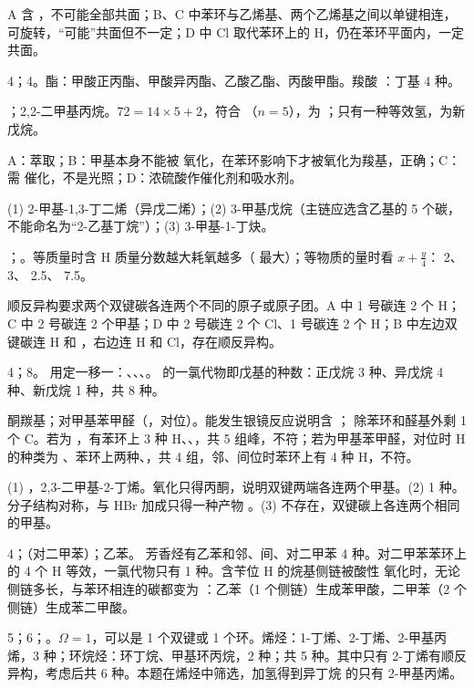 \begin{jiexilist}
\item {}A 含 ，不可能全部共面；B、C 中苯环与乙烯基、两个乙烯基之间以单键相连，可旋转，“可能”共面但不一定；D 中 Cl 取代苯环上的 H，仍在苯环平面内，一定共面。
\item 4；4。酯：甲酸正丙酯、甲酸异丙酯、乙酸乙酯、丙酸甲酯。羧酸 ：丁基 4 种。
\item {}；2,2-二甲基丙烷。$72=14\times5+2$，符合 （$n=5$），为 ；只有一种等效氢，为新戊烷。
\item {}A：萃取；B：甲基本身不能被  氧化，在苯环影响下才被氧化为羧基，正确；C：需  催化，不是光照；D：浓硫酸作催化剂和吸水剂。
\item (1) 2-甲基-1,3-丁二烯（异戊二烯）；(2) 3-甲基戊烷（主链应选含乙基的 5 个碳，不能命名为“2-乙基丁烷”）；(3) 3-甲基-1-丁炔。
\item {}；。等质量时含 H 质量分数越大耗氧越多（ 最大）；等物质的量时看 $x+\frac y4$： 2、 3、 2.5、 7.5。
\item {}顺反异构要求两个双键碳各连两个不同的原子或原子团。A 中 1 号碳连 2 个 H；C 中 2 号碳连 2 个甲基；D 中 2 号碳连 2 个 Cl、1 号碳连 2 个 H；B 中左边双键碳连 H 和 ，右边连 H 和 Cl，存在顺反异构。
\item 4；8。 用定一移一：、、、。 的一氯代物即戊基的种数：正戊烷 3 种、异戊烷 4 种、新戊烷 1 种，共 8 种。
\item 酮羰基；对甲基苯甲醛（，对位）。能发生银镜反应说明含 ； 除苯环和醛基外剩 1 个 C。若为 ，有苯环上 3 种 H、、，共 5 组峰，不符；若为甲基苯甲醛，对位时 H 的种类为 、苯环上两种、，共 4 组，邻、间位时苯环上有 4 种 H，不符。
\item (1) ，2,3-二甲基-2-丁烯。氧化只得丙酮，说明双键两端各连两个甲基。(2) 1 种。分子结构对称，与 HBr 加成只得一种产物 。(3) 不存在，双键碳上各连两个相同的甲基。
\item 4；（对二甲苯）；乙苯。 芳香烃有乙苯和邻、间、对二甲苯 4 种。对二甲苯苯环上的 4 个 H 等效，一氯代物只有 1 种。含苄位 H 的烷基侧链被酸性  氧化时，无论侧链多长，与苯环相连的碳都变为 ：乙苯（1 个侧链）生成苯甲酸，二甲苯（2 个侧链）生成苯二甲酸。
\item 5；6；。$\Omega=1$，可以是 1 个双键或 1 个环。烯烃：1-丁烯、2-丁烯、2-甲基丙烯，3 种；环烷烃：环丁烷、甲基环丙烷，2 种；共 5 种。其中只有 2-丁烯有顺反异构，考虑后共 6 种。本题在烯烃中筛选，加氢得到异丁烷  的只有 2-甲基丙烯。

\end{jiexilist}
